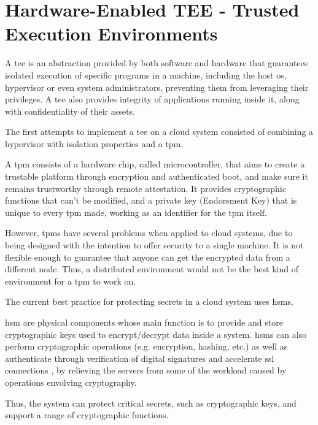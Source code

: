 
\section{Hardware-Enabled TEE - Trusted Execution Environments}

A \gls{tee} is an abstraction provided by both software and hardware that guarantees isolated execution of specific programs in a machine, including the host \gls{os}, hypervisor or even system administrators, preventing them from leveraging their privileges. A \gls{tee} also provides integrity of applications running inside it, along with confidentiality of their assets.

The first attempts to implement a \gls{tee} on a cloud system consisted of combining a hypervisor with isolation properties and a \gls{tpm}. 

A \gls{tpm} \cite{tpmPaper} consists of a hardware chip, called microcontroller, that aims to create a trustable platform through encryption and authenticated boot, and make sure it remains trustworthy through remote attestation. 
It provides cryptographic functions that can't be modified, and a private key (Endorsment Key) that is unique to every \gls{tpm} made, working as an identifier for the \gls{tpm} itself.

However, \gls{tpm}s have several problems when applied to cloud systems, due to being designed with the intention to offer security to a single machine. It is not flexible enough to guarantee that anyone can get the encrypted data from a different node.
Thus, a distributed environment would not be the best kind of environment for a \gls{tpm} to work on.

The current best practice for protecting secrets in a cloud system uses \gls{hsm}s. 

\gls{hsm} \cite{hsmPaper} are physical components whose main function is to provide and store cryptographic keys used to encrypt/decrypt data inside a system. \gls{hsm}s can also perform cryptographic operations (e.g. encryption, hashing, etc.) as well as authenticate through verification of digital signatures and accelerate \gls{ssl} connections \cite{hsmThesis}, by relieving the servers from some of the workload caused by operations envolving cryptography. 

Thus, the system can protect critical secrets, such as cryptographic keys, and support a range of cryptographic functions.

